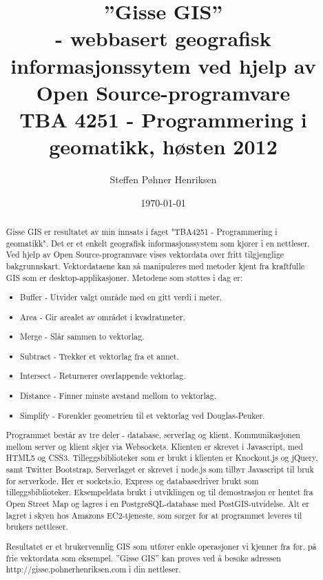 \documentclass[a4paper]{article}
\title{\textbf{''Gisse GIS''  \\- webbasert geografisk informasjonssytem ved hjelp av Open Source-programvare}
\\ \normalsize TBA 4251 - Programmering i geomatikk, høsten 2012}
\author{Steffen Pøhner Henriksen}
\date{\today}
\begin{document}
\maketitle
\vspace{3cm}

\pagebreak

\begin{abstract}

	Gisse GIS er resultatet av min innsats i faget "TBA4251 - Programmering i geomatikk". Det er et enkelt geografisk informasjonssystem som kjører i en nettleser. Ved hjelp av Open Source-programvare vises vektordata over fritt tilgjenglige bakgrunnskart. Vektordataene kan så manipuleres med metoder kjent fra kraftfulle GIS som er desktop-applikasjoner. Metodene som støttes i dag er:
	
	\begin{itemize}
		\item Buffer - Utvider valgt område med en gitt verdi i meter.
		\item Area - Gir arealet av området i kvadratmeter.
		\item Merge - Slår sammen to vektorlag.
		\item Subtract - Trekker et vektorlag fra et annet.
		\item Intersect - Returnerer overlappende vektorlag.
		\item Distance - Finner minste avstand mellom to vektorlag.
		\item Simplify - Forenkler geometrien til et vektorlag ved Douglas-Peuker. 
	\end{itemize}
	
	Programmet består av tre deler - database, serverlag og klient. Kommunikasjonen mellom server og klient skjer via Websockets\cite{websockets}. Klienten er skrevet i Javascript, med HTML5 og CSS3. Tilleggsbiblioteker som er brukt i klienten er Knockout.js og jQuery, samt Twitter Bootstrap. Serverlaget er skrevet i node.js som tilbyr Javascript til bruk for serverkode. Her er sockets.io, Express og databasedriver brukt som tilleggsbiblioteker. Eksempeldata brukt i utviklingen og til demostrasjon er hentet fra Open Street Map og lagres i en PostgreSQL-database med PostGIS-utvidelse. Alt er lagret i skyen hos Amazons EC2-tjeneste, som sørger for at programmet leveres til brukers nettleser. 
	
	Resultatet er et brukervennlig GIS som utfører enkle operasjoner vi kjenner fra før, på frie vektordata som eksempel. ''Gisse GIS'' kan prøves ved å besøke adressen http://gisse.pohnerhenriksen.com i din nettleser.
	
\end{abstract}
\newpage
\end{document}

